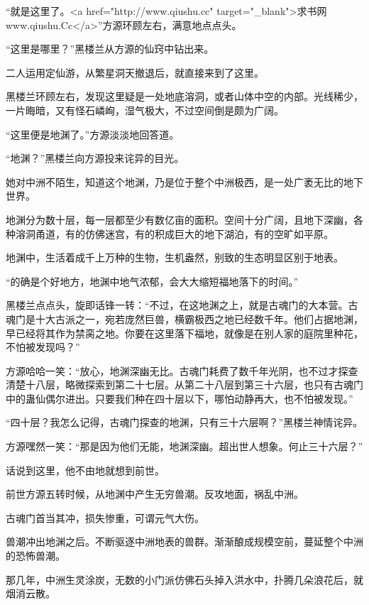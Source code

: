
\begin{this_body}

“就是这里了。<a href="http://www.qiushu.cc" target="\_blank">求书网www.qiushu.Cc</a>”方源环顾左右，满意地点点头。

“这里是哪里？”黑楼兰从方源的仙窍中钻出来。

二人运用定仙游，从繁星洞天撤退后，就直接来到了这里。

黑楼兰环顾左右，发现这里疑是一处地底溶洞，或者山体中空的内部。光线稀少，一片晦暗，又有怪石嶙峋，湿气极大，不过空间倒是颇为广阔。

“这里便是地渊了。”方源淡淡地回答道。

“地渊？”黑楼兰向方源投来诧异的目光。

她对中洲不陌生，知道这个地渊，乃是位于整个中洲极西，是一处广袤无比的地下世界。

地渊分为数十层，每一层都至少有数亿亩的面积。空间十分广阔，且地下深幽，各种溶洞甬道，有的仿佛迷宫，有的积成巨大的地下湖泊，有的空旷如平原。

地渊中，生活着成千上万种的生物，生机盎然，别致的生态明显区别于地表。

“的确是个好地方，地渊中地气浓郁，会大大缩短福地落下的时间。”

黑楼兰点点头，旋即话锋一转：“不过，在这地渊之上，就是古魂门的大本营。古魂门是十大古派之一，宛若庞然巨兽，横霸极西之地已经数千年。他们占据地渊，早已经将其作为禁脔之地。你要在这里落下福地，就像是在别人家的庭院里种花，不怕被发现吗？”

方源哈哈一笑：“放心，地渊深幽无比。古魂门耗费了数千年光阴，也不过才探查清楚十八层，略微探索到第二十七层。从第二十八层到第三十六层，也只有古魂门中的蛊仙偶尔进出。只要我们种在四十层以下，哪怕动静再大，也不怕被发现。”

“四十层？我怎么记得，古魂门探查的地渊，只有三十六层啊？”黑楼兰神情诧异。

方源嘿然一笑：“那是因为他们无能，地渊深幽。超出世人想象。何止三十六层？”

话说到这里，他不由地就想到前世。

前世方源五转时候，从地渊中产生无穷兽潮。反攻地面，祸乱中洲。

古魂门首当其冲，损失惨重，可谓元气大伤。

兽潮冲出地渊之后。不断驱逐中洲地表的兽群。渐渐酿成规模空前，蔓延整个中洲的恐怖兽潮。

那几年，中洲生灵涂炭，无数的小门派仿佛石头掉入洪水中，扑腾几朵浪花后，就烟消云散。


\end{this_body}
